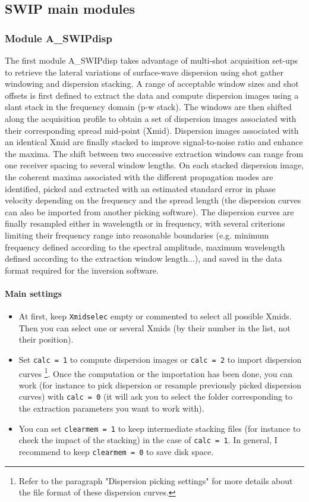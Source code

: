 \documentclass[twoside,a4paper]{article}
\begin{document}
\subsection{SWIP main modules}
\subsubsection{Module A\_SWIPdisp}
The first module A\_SWIPdisp takes advantage of multi-shot acquisition set-ups to retrieve the lateral variations of surface-wave dispersion using shot gather windowing and dispersion stacking. A range of acceptable window sizes and shot offsets is first defined to extract the data and compute dispersion images using a slant stack in the frequency domain (p-w stack). The windows are then shifted along the acquisition profile to obtain a set of dispersion images associated with their corresponding spread mid-point (Xmid). Dispersion images associated with an identical Xmid are finally stacked to improve signal-to-noise ratio and enhance the maxima. The shift between two successive extraction windows can range from one receiver spacing to several window lengths. On each stacked dispersion image, the coherent maxima associated with the different propagation modes are identified, picked and extracted with an estimated standard error in phase velocity depending on the frequency and the spread length (the dispersion curves can also be imported from another picking software). The dispersion curves are finally resampled either in wavelength or in frequency, with several criterions limiting their frequency range into reasonable boundaries (e.g. minimum frequency defined according to the spectral amplitude, maximum wavelength defined according to the extraction window length...), and saved in the data format required for the inversion software.

\paragraph{Main settings}
\begin{itemize}
\setlength\itemsep{2ex}
\setlength{\parindent}{5ex}
\item At first, keep \verb|Xmidselec| empty or commented to select all possible Xmids. Then you can select one or several Xmids (by their number in the list, not their position).

\item Set \verb|calc = 1| to compute dispersion images or \verb|calc = 2| to import dispersion curves \footnote{Refer to the paragraph "Dispersion picking settings" for more details about the file format of these dispersion curves.}. Once the computation or the importation has been done, you can work (for instance to pick dispersion or resample previously picked dispersion curves) with \verb|calc = 0| (it will ask you to select the folder corresponding to the extraction parameters you want to work with).

\item You can set \verb|clearmem = 1| to keep intermediate stacking files (for instance to check the impact of the stacking) in the case of \verb|calc = 1|. In general, I recommend to keep \verb|clearmem = 0| to save disk space.
\end{itemize}
\end{document}
